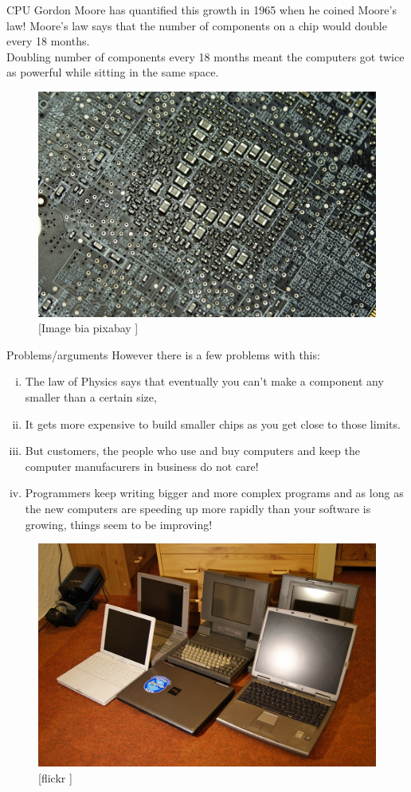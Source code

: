 \documentclass{beamer}
\begin{document}
\begin{frame}{CPU}
Gordon Moore has quantified this growth in 1965 when he coined Moore's law! Moore's law says that the number of components on a chip would double every 18 months.\\
Doubling number of components every 18 months meant the computers got twice as powerful while sitting in the same space.
\begin{figure}[!htbp]
\centering
\includegraphics[width=3 in , height=2 in]{Figures/CPU.jpg}
\caption{\tiny[Image bia pixabay ]}
\end{figure}
\end{frame}

\begin{frame}{Problems/arguments}
However there is a few problems with this:
\begin{enumerate}[i.]
\item <1->{\tiny The law of Physics says that eventually you can't make a component any smaller than a certain size,}
\item <2->  {\tiny It gets more expensive to build smaller chips as you get close to those limits.}
\item <3-> {\tiny But customers, the people who use and buy computers and keep the computer manufacurers in business do not care!}
\item <4-> {\tiny Programmers keep writing bigger and more complex programs and as long as the new computers are speeding up more rapidly than your software is growing, things seem to be improving!}
\end{enumerate}

\begin{figure}[!htbp]
\centering
\includegraphics[width=3 in , height=2 in]{Figures/oldcomp.jpg}
\caption{\tiny[flickr ]}
\end{figure}
\end{frame}
\end{document}
